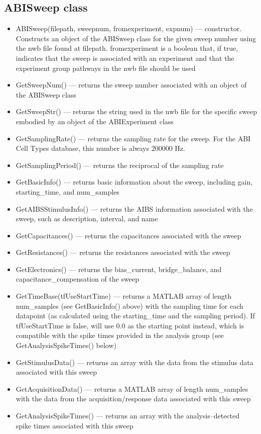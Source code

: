 \documentclass{article}
\begin{document}
\subsection{ABISweep class}
\begin{itemize}
	\item ABISweep(filepath, sweepnum, fromexperiment, expnum) --- constructor. Constructs an object of the ABISweep class for the given sweep number using the nwb file found at filepath. fromexperiment is a boolean that, if true, indicates that the sweep is associated with an experiment and that the experiment group pathways in the nwb file should be used
	\item GetSweepNum() --- returns the sweep number associated with an object of the ABISweep class
	\item GetSweepStr() --- returns the string used in the nwb file for the specific sweep embodied by an object of the ABIExperiment class
	\item GetSamplingRate() --- returns the sampling rate for the sweep.  For the ABI Cell Types database, this number is always 200000 Hz.
	\item GetSamplingPeriod() --- returns the reciprocal of the sampling rate
	\item GetBasicInfo() --- returns basic information about the sweep, including gain, starting\_time, and num\_samples
	\item GetAIBSStimulusInfo() --- returns the AIBS information associated with the sweep, such as description, interval, and name
	\item GetCapacitances() --- returns the capacitances associated with the sweep
	\item GetResistances() --- returns the resistances associated with the sweep
	\item GetElectronics() --- returns the bias\_current, bridge\_balance, and capacitance\_compensation of the sweep
	\item GetTimeBase(tfUseStartTime) --- returns a MATLAB array of length num\_samples (see GetBasicInfo() above) with the sampling time for each datapoint (as calculated using the starting\_time and the sampling period). If tfUseStartTime is false, will use 0.0 as the starting point instead, which is compatible with the spike times provided in the analysis group (see GetAnalysisSpikeTimes() below)
	\item GetStimulusData() --- returns an array with the data from the stimulus data associated with this sweep
	\item GetAcquisitionData() --- returns a MATLAB array of length num\_samples with the data from the acquisition/response data associated with this sweep
	\item GetAnalysisSpikeTimes() --- returns an array with the analysis--detected spike times associated with this sweep
\end{itemize}

{}
{}
{\footnotesize}
\end{document}

